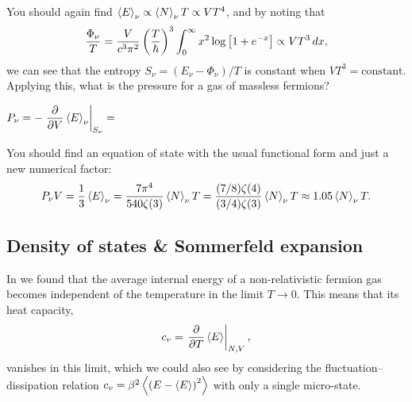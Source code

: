 You should again find $\left\langle E \right\rangle_{\nu} \propto \left\langle N \right\rangle_{\nu} T \propto VT^4$, and by noting that
\begin{equation*}
  \frac{\Phi_{\nu}}{T} = \frac{V}{c^3 \pi^2} \left(\frac{T}{\hbar}\right)^3 \int_0^{\infty} x^2 \log\left[1 + e^{-x}\right] \propto VT^3 \mathop{dx},
\end{equation*}
we can see that the entropy $S_{\nu} = \left(E_{\nu} - \Phi_{\nu}\right) / T$ is constant when $V T^3 = \mbox{constant}$.
Applying this, what is the pressure for a gas of massless fermions?
\begin{mdframed}
  $\displaystyle P_{\nu} = -\left. \frac{\partial }{\partial V} \left\langle E \right\rangle_{\nu} \right|_{S_{\nu}} = $ \\[100 pt]
\end{mdframed}
You should find an equation of state with the usual functional form and just a new numerical factor:
\begin{equation*}
  P_{\nu} V = \frac{1}{3} \left\langle E \right\rangle_{\nu} = \frac{7\pi^4}{540\zeta(3)} \left\langle N \right\rangle_{\nu} T = \frac{(7/8)\zeta(4)}{(3/4)\zeta(3)} \left\langle N \right\rangle_{\nu} T \approx 1.05 \left\langle N \right\rangle_{\nu} T.
\end{equation*}



\subsection{\label{sec:Sommerfeld}Density of states \& Sommerfeld expansion}
In  we found that the average internal energy of a non-relativistic fermion gas becomes independent of the temperature in the limit $T \to 0$.
This means that its heat capacity,
\begin{equation*}
  c_v = \left. \frac{\partial }{\partial T} \left\langle E \right\rangle \right|_{N,V},
\end{equation*}
vanishes in this limit, which we could also see by considering the fluctuation--dissipation relation $c_v = \beta^2 \left\langle \left(E - \left\langle E \right\rangle\right)^2 \right\rangle$ with only a single micro-state. %


